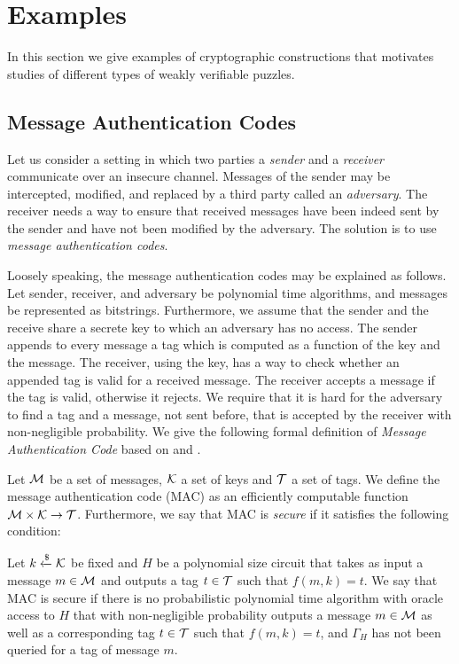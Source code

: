 \section{Examples}
\label{section:wvp_examples}
In this section we give examples of cryptographic constructions that motivates studies of different types of weakly verifiable puzzles.

\subsection{Message Authentication Codes}
Let us consider a setting in which two parties a \textit{sender} and a \textit{receiver} communicate over an insecure channel.
Messages of the sender may be intercepted, modified, and replaced by a third party called an \textit{adversary}.
The receiver needs a way to ensure that received messages have been indeed sent by the sender and have not been modified by the adversary.
The solution is to use \textit{message authentication codes}.

Loosely speaking, the message authentication codes may be explained as follows.
Let sender, receiver, and adversary be polynomial time algorithms, and messages be represented as bitstrings.
Furthermore, we assume that the sender and the receive share a secrete key to which an adversary has no access.
The sender appends to every message a tag which is computed as a function of the key and the message.
The receiver, using the key, has a way to check whether an appended tag is valid for a received message.
The receiver accepts a message if the tag is valid, otherwise it rejects.
We require that it is hard for the adversary to find a tag and a message, not sent before, that is accepted by the receiver with non-negligible probability.
We give the following formal definition of \textit{Message Authentication Code} based on \cite{LectureNotesCrypo} and \cite{Goldreich:2004:FCV:975541}.
\begin{definition}
  \label{def:mac}
  Let $\mathcal{M}$ be a set of messages, $\mathcal{K}$ a set of keys and $\mathcal{T}$ a set of tags.
  We define the \textnormal{message authentication code (MAC)} as an efficiently computable function $\mathcal{M} \times \mathcal{K} \rightarrow \mathcal{T}$.
  Furthermore, we say that MAC is \textit{secure} if it satisfies the following condition:

  Let $k \xleftarrow{\$} \mathcal{K}$ be fixed and $H$ be a polynomial size circuit that takes as input a message $m \in \mathcal{M}$ and outputs a tag $t \in \mathcal{T}$
  such that $f(m,k) = t$. We say that MAC is secure if there is no probabilistic polynomial time algorithm
  with oracle access to $H$ that with non-negligible probability outputs a message $m \in \mathcal{M}$
  as well as a corresponding tag $t \in \mathcal{T}$ such that $f(m, k) = t$, and $\Gamma_H$ has not been queried for a tag of message $m$.
\end{definition}

